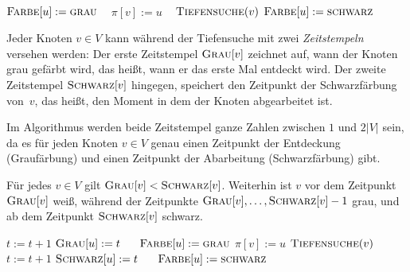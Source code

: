 \begin{bem}\ 
\begin{algorithm}[H]
	\caption{$\cc{Tiefensuche}(u)$}
	\begin{algorithmic}[1]
		\STATE $\mathop{\text{\textsc{Farbe}}}[u]:=\mathop{\text{\textsc{grau}}}$ \  
		\FOR{$v \in N[u]$}
		\STATE  {}
		\STATE $\pi[v]:=u$   \  
		\STATE $\mathop{\text{\textsc{Tiefensuche}}}(v)$
		\ENDIF
		\ENDFOR
		\STATE $\mathop{\text{\textsc{Farbe}}}[u]:=\mathop{\text{\textsc{schwarz}}}$ 
	\end{algorithmic}
\end{algorithm}
\end{bem}





\begin{bem} 
 Jeder Knoten $v \in V$ kann während der Tiefensuche mit zwei \emph{Zeitstempeln} versehen werden: Der erste Zeitstempel $\mathop{\text{\textsc{Grau}}}[v]$ zeichnet auf, wann der Knoten grau gefärbt wird, das heißt, wann er das erste Mal entdeckt wird.
Der zweite Zeitstempel $\mathop{\text{\textsc{Schwarz}}}[v]$ hingegen, speichert den Zeitpunkt der Schwarzfärbung von~$v$, das heißt, den Moment in dem der Knoten abgearbeitet ist.

Im Algorithmus werden beide Zeitstempel ganze Zahlen zwischen $1$ und $2 |V|$ sein, da es für jeden Knoten $v \in V$ genau einen Zeitpunkt der Entdeckung (Graufärbung) und einen Zeitpunkt der Abarbeitung (Schwarzfärbung) gibt.

Für jedes $v \in V$ gilt $\mathop{\text{\textsc{Grau}}}[v] < \mathop{\text{\textsc{Schwarz}}}[v]$.
Weiterhin ist $v$ vor dem Zeitpunkt $\mathop{\text{\textsc{Grau}}}[v]$ weiß, während der Zeitpunkte $\mathop{\text{\textsc{Grau}}}[v],\ldots,\mathop{\text{\textsc{Schwarz}}}[v]-1$ grau, und ab dem Zeitpunkt $\mathop{\text{\textsc{Schwarz}}}[v]$ schwarz.


\begin{algorithm}[H]
	\caption{$\cc{Tiefensuche}(u)$}
	\begin{algorithmic}[1]
		\STATE $t := t + 1$ 
		\STATE $\mathop{\text{\textsc{Grau}}}[u] := t$ $\quad$ 
		\STATE $\mathop{\text{\textsc{Farbe}}}[u]:=\mathop{\text{\textsc{grau}}}$
		 \STATE $\pi[v]:=u$  
		\STATE $\mathop{\text{\textsc{Tiefensuche}}}(v)$
		\ENDIF
		\ENDFOR
		\STATE $t := t + 1$ 
		\STATE\label{line:schwarzfaerbung-in-tiefensuche} $\mathop{\text{\textsc{Schwarz}}}[u] := t$ $\quad$ 
		\STATE $\mathop{\text{\textsc{Farbe}}}[u]:=\mathop{\text{\textsc{schwarz}}}$
	\end{algorithmic}
\end{algorithm}
\end{bem}

